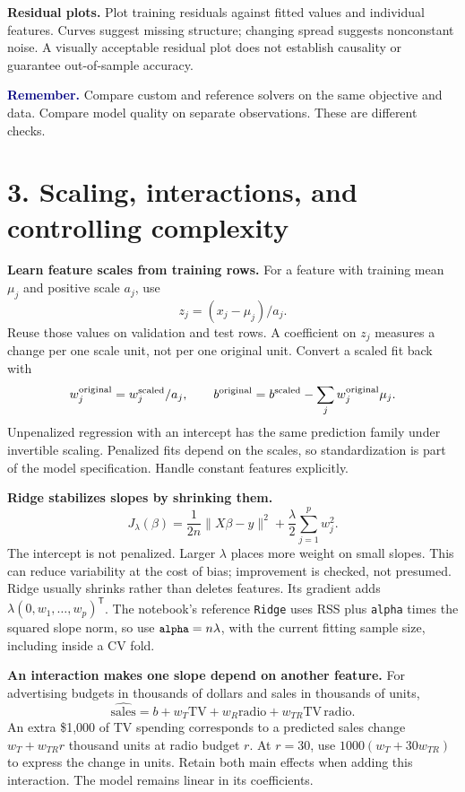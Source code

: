 \documentclass[11pt,a4paper]{article}
\newcommand{\T}{^{\mathsf T}}
\newcommand{\code}[1]{\texttt{\small #1}}
\newcommand{\idea}[1]{\textcolor{navy}{\textbf{Remember.}} #1}
\begin{document}
\textbf{Residual plots.} Plot training residuals against fitted values and
individual features. Curves suggest missing structure; changing spread suggests
nonconstant noise. A visually acceptable residual plot does not establish
causality or guarantee out-of-sample accuracy.

\idea{Compare custom and reference solvers on the same objective and data.
Compare model quality on separate observations. These are different checks.}

\newpage
\section*{3. Scaling, interactions, and controlling complexity}
\textbf{Learn feature scales from training rows.}
For a feature with training mean $\mu_j$ and positive scale $a_j$, use
\[
z_j=(x_j-\mu_j)/a_j.
\]
Reuse those values on validation and test rows. A coefficient on $z_j$ measures
a change per one scale unit, not per one original unit. Convert a scaled fit
back with
\[
w_j^{\rm original}=w_j^{\rm scaled}/a_j,\qquad
b^{\rm original}=b^{\rm scaled}-\sum_jw_j^{\rm original}\mu_j.
\]
Unpenalized regression with an intercept has the same prediction family under
invertible scaling. Penalized fits depend on the scales, so standardization is
part of the model specification. Handle constant features explicitly.

\textbf{Ridge stabilizes slopes by shrinking them.}
\[
\boxed{J_\lambda(\beta)=\frac1{2n}\|X\beta-y\|^2
+\frac\lambda2\sum_{j=1}^p w_j^2.}
\]
The intercept is not penalized. Larger $\lambda$ places more weight on small
slopes. This can reduce variability at the cost of bias; improvement is checked,
not presumed. Ridge usually shrinks rather than deletes features.
Its gradient adds $\lambda(0,w_1,\ldots,w_p)\T$.
The notebook's reference \code{Ridge} uses RSS plus \code{alpha} times the
squared slope norm, so use $\code{alpha}=n\lambda$, with the current fitting
sample size, including inside a CV fold.

\textbf{An interaction makes one slope depend on another feature.}
For advertising budgets in thousands of dollars and sales in thousands of units,
\[
\widehat{\mathrm{sales}}=b+w_T\mathrm{TV}+w_R\mathrm{radio}
+w_{TR}\mathrm{TV}\,\mathrm{radio}.
\]
An extra \$1,000 of TV spending corresponds to a predicted sales change
$w_T+w_{TR}r$ thousand units at radio budget $r$. At $r=30$, use
$1000(w_T+30w_{TR})$ to express the change in units. Retain both main effects
when adding this interaction. The model remains linear in its coefficients.
\end{document}
